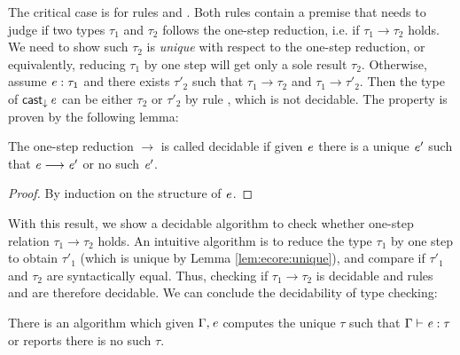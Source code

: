 The critical case is for rules  and .
Both rules contain a premise that needs to judge if two types $\tau_{{\mathrm{1}}}$ and
$\tau_{{\mathrm{2}}}$ follows the one-step reduction, i.e. if $\tau_{{\mathrm{1}}}  \longrightarrow  \tau_{{\mathrm{2}}}$ holds. We need
to show such $\tau_{{\mathrm{2}}}$ is \emph{unique} with respect to the one-step reduction,
or equivalently, reducing $\tau_{{\mathrm{1}}}$ by one step will get only a sole result
$\tau_{{\mathrm{2}}}$. Otherwise, assume $\mathit{e}:\tau_{{\mathrm{1}}}$ and there exists $\tau'_{{\mathrm{2}}}$ such that
$\tau_{{\mathrm{1}}}  \longrightarrow  \tau_{{\mathrm{2}}}$ and $\tau_{{\mathrm{1}}}  \longrightarrow  \tau'_{{\mathrm{2}}}$. Then the type of $\mathsf{cast}_{\downarrow} \, \mathit{e}$ can be
either $\tau_{{\mathrm{2}}}$ or $\tau'_{{\mathrm{2}}}$ by rule , which is not
decidable. The property is proven by the following lemma:

\begin{lem}\label{lem:ecore:unique}
	The one-step reduction $ \longrightarrow $ is called decidable if 
given $\mathit{e}$ there is a unique $\mathit{e'}$ such that $\mathit{e}  \longrightarrow  \mathit{e'}$ or no such $\mathit{e'}$.
\end{lem}

\begin{proof}
	By induction on the structure of $\mathit{e}$.
\end{proof}

With this result, we show a decidable algorithm to check whether one-step
relation $\tau_{{\mathrm{1}}}  \longrightarrow  \tau_{{\mathrm{2}}}$ holds. An intuitive algorithm is to reduce the type
$\tau_{{\mathrm{1}}}$ by one step to obtain $\tau'_{{\mathrm{1}}}$ (which is unique by Lemma
\ref{lem:ecore:unique}), and compare if $\tau'_{{\mathrm{1}}}$ and $\tau_{{\mathrm{2}}}$ are
syntactically equal. Thus, checking if $\tau_{{\mathrm{1}}}  \longrightarrow  \tau_{{\mathrm{2}}}$ is decidable and rules
 and  are therefore decidable. We can
conclude the decidability of type checking:

\begin{thm}\label{lem:ecore:decide}
	There is an algorithm which given $\Gamma, \mathit{e}$ computes the unique
$\tau$ such that $\Gamma  \vdash  \mathit{e}  :  \tau$ or reports there is no such $\tau$.
\end{thm}

